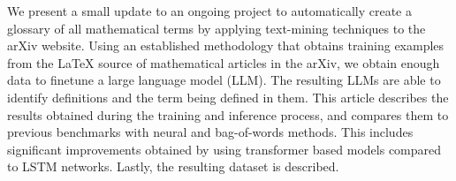 We present a small update to an ongoing project to automatically create a glossary of all mathematical terms by applying text-mining techniques to the arXiv website. Using an established methodology that obtains training examples from the \LaTeX{} source of mathematical articles in the arXiv, we obtain enough data to finetune a large language model (LLM). The resulting LLMs are able to identify definitions and the term being defined in them.  This article describes the results obtained during the training and inference process, and compares them to previous benchmarks with neural and bag-of-words methods. This includes  significant improvements obtained by using transformer based models compared to LSTM networks. Lastly, the resulting dataset is described. 

